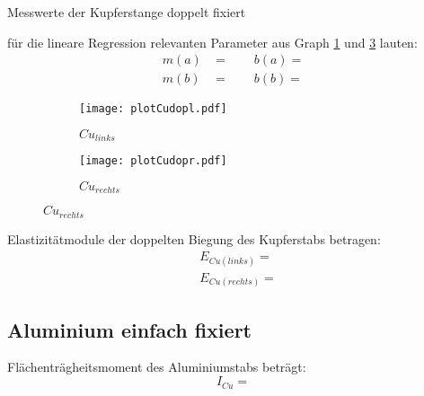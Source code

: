 \begin{table}[H]
    \centering
    
    \caption{Messwerte der Kupferstange doppelt fixiert}
    \label{tab:2}
\end{table}

\justifying für die lineare Regression relevanten Parameter aus Graph \ref{fig:2a} und \ref{fig:2b} lauten:
\begin{subequations}\label{eq:}
\begin{align}
    m(a) &= \text{} \qquad
    b(a) = \text{}\label{eq:a}\\
    m(b) &= \text{} \qquad
    b(b) = \text{}\label{eq:b}
\end{align}
\end{subequations}

\begin{figure}[H]
\caption{Graph für Doppelbiegung, $Cu_{links}$ und $Cu_{rechts}$}
\label{fig:2}
\begin{subfigure}{0.495\linewidth}
    \centering
    \texttt{[image: plotCudopl.pdf]}
    \caption{$Cu_{links}$}
    \label{fig:2a}
\end{subfigure}
\begin{subfigure}{0.495\linewidth}
    \centering
    \texttt{[image: plotCudopr.pdf]}
    \caption{$Cu_{rechts}$}
    \label{fig:2b}
\end{subfigure}
\end{figure}

\justifying Elastizitätmodule der doppelten Biegung des Kupferstabs betragen:
\begin{align}
    &E_{Cu(links)} = \text{} \label{eq:}\\
    &E_{Cu(rechts)} = \text{} \label{eq:}
\end{align}


\subsection{Aluminium einfach fixiert}

\justifying Flächenträgheitsmoment des Aluminiumstabs beträgt:
\begin{equation}
I_{Cu} = \text{} \label{eq:}
\end{equation}

